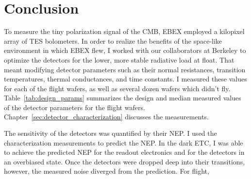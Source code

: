 \chapter{Conclusion}
\label{conclusion_chapter}

To measure the tiny polarization signal of the \ac{CMB}, \ac{EBEX} employed a kilopixel array of \ac{TES} bolometers. 
In order to realize the benefits of the space-like environment in which \ac{EBEX} flew, I worked with our collaborators at Berkeley to optimize the detectors for the lower, more stable radiative load at float.  
That meant modifying detector parameters such as their normal resistances, transition temperatures, thermal conductances, and time constants. 
I measured these values for each of the flight wafers, as well as several dozen wafers which didn't fly. 
Table~\ref{tab:design_params} summarizes the design and median measured values of the detector parameters for the flight wafers. 
Chapter~\ref{sec:detector_characterization} discusses the measurements. 

The sensitivity of the detectors was quantified by their \ac{NEP}. 
I used the characterization measurements to predict the \ac{NEP}.
In the dark \ac{ETC}, I was able to achieve the predicted \ac{NEP} for the readout electronics and for the detectors in an overbiased state.
Once the detectors were dropped deep into their transitions, however, the measured noise diverged from the prediction.  
For flight, 


